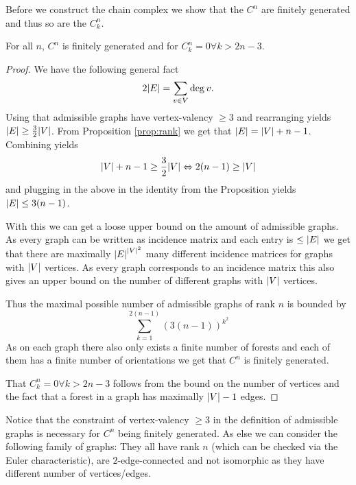 Before we construct the chain complex we show that the $C^{n}$ are finitely generated and thus so are the $C_{k}^{n}$.

\begin{theorem}\label{thm:finGenCn}
	For all $n$, $C^{n}$ is finitely generated and for $C_{k}^{n} = 0 \forall k > 2n-3$. 
\end{theorem}

\begin{proof}
	We have the following general fact
	\[
		2 \abs{E} = \sum_{v \in V} \deg{v}
	.\] 
	Using that admissible graphs have vertex-valency $\geq 3$ and rearranging yields $\abs{E} \geq \frac{3}{2} \abs{V}$.
	From Proposition \ref{prop:rank} we get that $\abs{E} = \abs{V} + n-1$.
	Combining yields
	\[
		\abs{V} + n -1 \geq \frac{3}{2} \abs{V} \Leftrightarrow 2 (n-1) \geq \abs{V}
	\] 
	and plugging in the above in the identity from the Proposition yields $\abs{E} \leq 3 (n-1)$.

	With this we can get a loose upper bound on the amount of admissible graphs.
	As every graph can be written as incidence matrix and each entry is $\leq \abs{E}$ we get that there are maximally
	$\abs{E}^{\abs{V}^2}$ many different incidence matrices for graphs with  $\abs{V}$ vertices.
	As every graph corresponds to an incidence matrix this also gives an upper bound on the number of different graphs with $\abs{V}$ vertices.

	Thus the maximal possible number of admissible graphs of rank $n$ is bounded by
	\[
		\sum_{k=1}^{2(n-1)} (3 (n-1))^{k^2} 
	\] 
	As on each graph there also only exists a finite number of forests and each of them has a finite number of orientations we get that
	$C^{n}$ is finitely generated.

	That $C_{k}^{n} = 0 \forall k > 2n -3$ follows from the bound on the number of vertices and the fact that a forest in a graph has maximally $\abs{V} - 1$ edges.
\end{proof}

\begin{remark}
	Notice that the constraint of vertex-valency $\geq 3$ in the definition of admissible graphs is necessary for $C^{n}$ being finitely generated.
	As else we can consider the following family of graphs:
	They all have rank $n$ (which can be checked via the Euler characteristic), are $2$-edge-connected and not isomorphic as they have different number of vertices/edges.
\end{remark}

